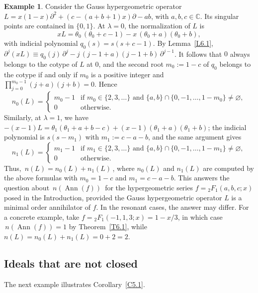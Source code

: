 \documentclass[11pt,reqno]{amsart}
\theoremstyle{plain}
\theoremstyle{definition}
\newtheorem{example}{Example}[section]
\theoremstyle{remark}
\numberwithin{equation}{section}
\newcommand{\C}{\mathbb{C}}
\newcommand{\del}{\partial}
\DeclareMathOperator{\Ann}{Ann}
\begin{document}
\begin{example}
\label{Ex6.9}
Consider the Gauss hypergeometric operator $L = x(1-x) \del^2 + (c - (a+b+1) x) \del - ab$, with
$a, b, c \in \C$. Its singular points are contained in $\{0, 1\}$. At $\lambda = 0$, the
normalization of $L$ is
\[
  x L = \theta_0\, (\theta_0 + c - 1) - x\, (\theta_0 + a)(\theta_0 + b) ,
\]
with indicial polynomial $q_0(s) = s (s + c - 1)$. By Lemma~\ref{L6.1}, $\del^j (xL) \equiv
q_0(j)\, \del^j - j\, (j - 1 + a)(j - 1 + b)\, \del^{j-1}$. It follows that $0$ always belongs to
the cotype of $L$ at $0$, and the second root $m_0 := 1 - c$ of $q_0$ belongs to the cotype if
and only if $m_0$ is a positive integer and $\prod_{j=0}^{m_0-1} (j + a)(j + b) = 0$. Hence
\[
  n_0(L) = \begin{cases} m_0 - 1 & \text{if } m_0 \in \{2, 3, \ldots\} \text{ and } \{a, b\} \cap
  \{0, -1, \ldots, 1 - m_0\} \ne \varnothing , \\ 0 & \text{otherwise} . \end{cases}
\]
Similarly, at $\lambda = 1$, we have $-(x-1) L = \theta_1 (\theta_1 + a + b - c) + (x - 1)
(\theta_1 + a)(\theta_1 + b)$; the indicial polynomial is $s (s - m_1)$ with $m_1 := c - a - b$,
and the same argument gives
\[
  n_1(L) = \begin{cases} m_1 - 1 & \text{if } m_1 \in \{2, 3, \ldots\} \text{ and } \{a, b\} \cap
  \{0, -1, \ldots, 1 - m_1\} \ne \varnothing , \\ 0 & \text{otherwise} . \end{cases}
\]
%
Thus,  $\,n(L) = n_0(L) + n_1(L)\,$, where $n_0(L)$ and $n_1(L)$ are computed by the above formulas with $m_0 =  1 -c $ and $ m_1 = c - a - b $. This answers the question about  $\,n(\Ann(f))\,$ for the hypergeometric series $ f = {}_{2}F_1(a,b,c; x) $ posed in the Introduction,
provided the Gauss hypergeometric operator $L$ is a minimal order annihilator of $f$. In the resonant cases, the answer may differ. For a concrete example, take 
$ f = {}_{2}F_1(-1,1,3; x) = 1-x/3 $, in which case $\,n(\Ann(f)) = 1 $ by Theorem~\ref{T6.1}, while $n(L) = n_0(L) + n_1(L) = 0 + 2 = 2 $.
\end{example}

\subsection{Ideals that are not closed}
\label{S6.4}
The next example illustrates Corollary~\ref{C5.1}.
\end{document}

